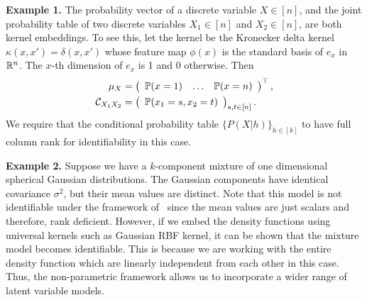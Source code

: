 \documentclass{article}
\begin{document}



{\bf Example 1.} The probability vector of a discrete variable $X \in [n]$, and the joint probability table of two discrete variables $X_1 \in [n]$ and $X_2 \in [n]$, are both kernel embeddings. To see this, let the kernel be the Kronecker delta kernel $\kappa(x,x') = \delta(x,x')$ whose feature map $\phi(x)$ is the standard basis of $e_{x}$ in $\mathbb{R}^n$. The $x$-th dimension of $e_{x}$ is 1 and 0 otherwise. Then
\begin{align}
    \mu_X
		& = \left(
      \begin{array}{ccc}
         \mathbb{P}(x = 1) &
         \hdots &
         \mathbb{P}(x = n)
       \end{array}
    \right)^\top, \nonumber \\
		\mathcal{C}_{X_1X_2}
		&=
		\left(
        \begin{array}{c}
            \mathbb{P}(x_1=s,x_2=t) \cr
        \end{array}
    \right)_{s,t \in [n]}. \nonumber
\end{align}
We require that the conditional probability table $\{P(X|h)\}_{h\in [k]}$ to  have full column rank for identifiability in this case.


{\bf Example 2.} Suppose we have a $k$-component mixture of one dimensional  spherical Gaussian distributions. The Gaussian components have identical covariance  $\sigma^2$, but their mean values are distinct. Note that this model is not identifiable under the framework of~\citet{HsuKak13} since the mean values are just scalars and therefore, rank deficient. However, if we embed the density functions using universal kernels such as Gaussian RBF kernel, it can be shown that the mixture model becomes identifiable. This is because we are working with the entire density function which are linearly independent from each other in this case. Thus, the non-parametric framework allows us to incorporate a wider range of latent variable  models.
\end{document}
